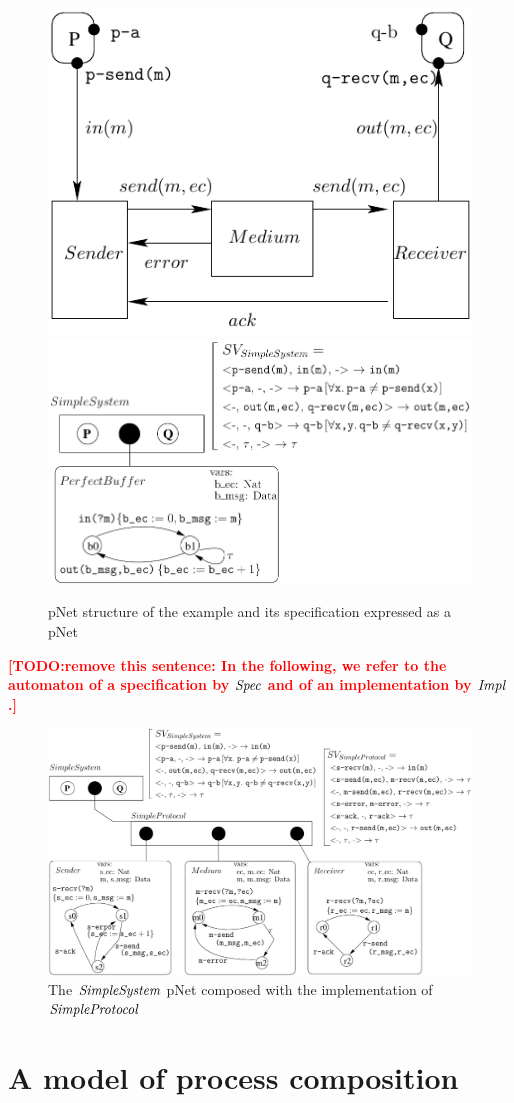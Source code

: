 \documentclass{lmcs}
\newcommand{\TODO}[1]{\textcolor{red}{\textbf{[TODO:#1]}}}
\begin{document}
\begin{figure}[t]
   \includegraphics[width=.37\textwidth]{XFIG/SimpleProt-Schema.pdf}
   \includegraphics[width=.62\textwidth]{XFIG/SimpleProt2-Spec.pdf}
   \caption{pNet structure of the example and its specification expressed as a pNet}
   \label{SimpleProt:Spec}
\end{figure}

\TODO{remove this sentence: 
In the following, we refer to the automaton of a specification by $\symb{Spec}$ and of an implementation by $\symb{Impl}$.}
  
\begin{figure}[t]
  \centerline{\includegraphics[width=.95\textwidth]{XFIG/SimpleProt2-pNet-tau}}
  \caption{The $\symb{SimpleSystem}$ pNet composed with the implementation of $\symb{SimpleProtocol}$}  \label{SimpleProt:Impl}
\end{figure}



\section{A model of process composition}\label{sec:OT}
\end{document}
